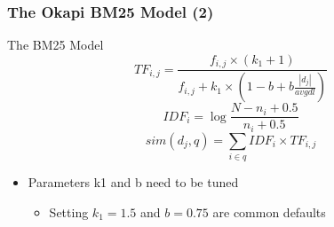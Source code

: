 \documentclass[svgnames]{beamer}
\begin{document}
\begin{frame} \frametitle{The Okapi BM25 Model (2)}
\begin{block}{The BM25 Model}
    \begin{displaymath}
          TF_{i,j} = \frac{f_{i,j} \times (k_1 + 1)}
                                  {f_{i,j} + k_1 \times \left( 1-b+b\frac{|d_j|}{avgdl} \right)}
    \end{displaymath}
    \begin{displaymath}
        IDF_i = \log\frac{N - n_i + 0.5}{n_i + 0.5}
    \end{displaymath}
    \begin{displaymath}
          sim(d_j,q) =
          \sum_{i \in q} IDF_i \times TF_{i,j} 
    \end{displaymath}
\end{block}
\begin{itemize}
\item Parameters k1 and b need to be tuned
\begin{itemize}
\item Setting $k_1 = 1.5$ and $b = 0.75$ are common defaults
\end{itemize}
\end{itemize}
\end{frame}

\end{document}
